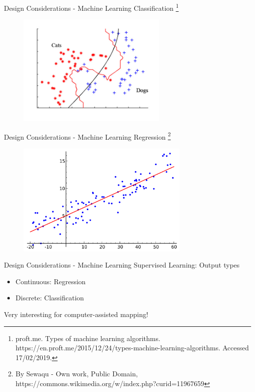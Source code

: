 \documentclass{beamer}
\newcommand\blfootnote[1]{%
  \begingroup
  \renewcommand\thefootnote{}\footnote{#1}%
  \addtocounter{footnote}{-1}%
  \endgroup
}
\begin{document}
\begin{frame}{Design Considerations - Machine Learning}
    Classification\blfootnote{proft.me. Types of machine learning algorithms. https://en.proft.me/2015/12/24/types-machine-learning-algorithms. Accessed 17/02/2019.}
    \begin{figure}[h]
        \includegraphics[width=0.65\textwidth]{ml_classification.jpg}
    \end{figure}
\end{frame}

\begin{frame}{Design Considerations - Machine Learning}
    Regression\blfootnote{By Sewaqu - Own work, Public Domain, https://commons.wikimedia.org/w/index.php?curid=11967659}
    \begin{figure}[h]
        \includegraphics[width=0.75\textwidth]{regression.png}
    \end{figure}
\end{frame}

\begin{frame}{Design Considerations - Machine Learning}
    Supervised Learning: Output types
    \begin{itemize}
        \item Continuous: Regression
        \item Discrete: Classification
    \end{itemize}
    Very interesting for computer-assisted mapping!
\end{frame}
\end{document}
